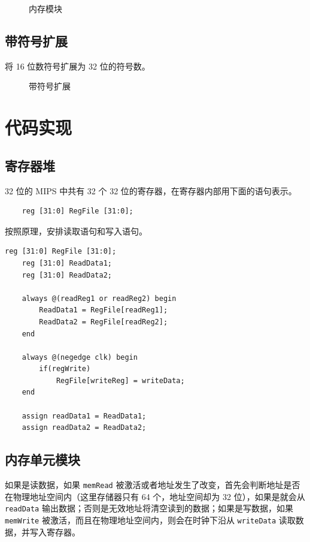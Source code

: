\documentclass[a4paper,UTF8]{ctexart}
\begin{document}
\begin{figure}[h]
    \centering
    
    \caption{内存模块}
\end{figure}

\subsection{带符号扩展}

将 16 位数符号扩展为 32 位的符号数。

\begin{figure}[H]
    \centering
    
    \caption{带符号扩展}
\end{figure}

\section{代码实现}

\subsection{寄存器堆}

32 位的 MIPS 中共有 32 个 32 位的寄存器，在寄存器内部用下面的语句表示。
\begin{lstlisting}
    reg [31:0] RegFile [31:0];
\end{lstlisting}

按照原理，安排读取语句和写入语句。
\begin{lstlisting}[caption=Registers.v]
    reg [31:0] RegFile [31:0];
    reg [31:0] ReadData1;
    reg [31:0] ReadData2;

    always @(readReg1 or readReg2) begin
        ReadData1 = RegFile[readReg1];
        ReadData2 = RegFile[readReg2];
    end
    
    always @(negedge clk) begin
        if(regWrite)
            RegFile[writeReg] = writeData;
    end

    assign readData1 = ReadData1;
    assign readData2 = ReadData2;
\end{lstlisting}

\subsection{内存单元模块}

如果是读数据，如果 \verb"memRead" 被激活或者地址发生了改变，首先会判断地址是否在物理地址空间内（这里存储器只有 64 个，地址空间却为 32 位），如果是就会从 \verb"readData" 输出数据；否则是无效地址将清空读到的数据；如果是写数据，如果 \verb"memWrite" 被激活，而且在物理地址空间内，则会在时钟下沿从 \verb"writeData" 读取数据，并写入寄存器。
\end{document}

